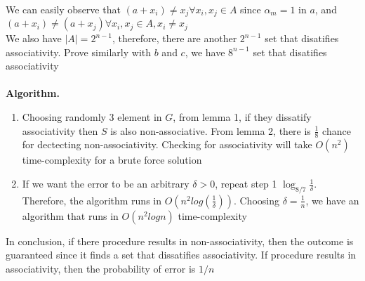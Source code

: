 \documentclass[12pt,twoside]{article}
\begin{document}
\\
We can easily observe that $(a + x_i) \neq x_j \forall x_i, x_j \in A$ since $\alpha_m = 1$ in $a$, and $(a + x_i) \neq (a + x_j) \forall x_i, x_j \in A, x_i \neq x_j$ \\
We also have $|A| = 2^{n-1}$, therefore, there are another $2^{n-1}$ set that disatifies associativity.
Prove similarly with $b$ and $c$, we have $8^{n-1}$ set that disatifies associativity
\\
\\
\textbf{Algorithm.}
\begin{enumerate}
\item Choosing randomly 3 element in $G$, from lemma 1, if they dissatify associativity then $S$ is also non-associative. From lemma 2, there is $\frac{1}{8}$ chance for dectecting non-associativity. Checking for associativity will take $O(n^2)$ time-complexity for a brute force solution
\item If we want the error to be an arbitrary $\delta > 0$, repeat step 1 $\log_{8/7}\frac{1}{\delta}$. Therefore, the algorithm runs in $O(n^2 log(\frac{1}{\delta}))$. Choosing $\delta = \frac{1}{n}$, we have an algorithm that runs in $O(n^2 log n)$ time-complexity
\end{enumerate}
In conclusion, if there procedure results in non-associativity, then the outcome is guaranteed since it finds a set that dissatifies associativity. If procedure results in associativity, then the probability of error is $1/n$ 
\
\end{document}
